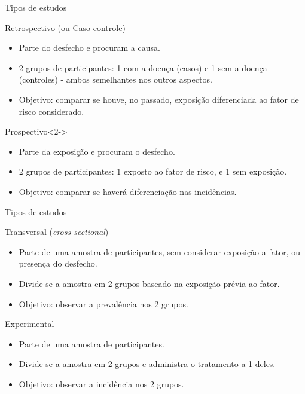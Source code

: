 \documentclass{beamer}
\begin{document}
\begin{frame}{\scriptsize Tipos de estudos}
  \begin{block}{Retrospectivo (ou Caso-controle)}
    \footnotesize
    \begin{itemize}
      \footnotesize
    \item Parte do desfecho e procuram a causa.
    \item 2 grupos de participantes: 1 com a doença (casos) e 1 sem a doença (controles) - ambos semelhantes nos outros aspectos.
    \item Objetivo: comparar se houve, no passado, exposição diferenciada ao fator de risco considerado.
    \end{itemize}
  \end{block}
  \begin{block}{Prospectivo}<2->
    \footnotesize
    \begin{itemize}
      \footnotesize
    \item Parte da exposição e procuram o desfecho.
    \item 2 grupos de participantes: 1 exposto ao fator de risco, e 1 sem exposição.
    \item Objetivo: comparar se haverá diferenciação nas incidências.
    \end{itemize}
  \end{block}
\end{frame}

\begin{frame}{\scriptsize Tipos de estudos}
  \begin{block}{Transversal ({\em cross-sectional})}
    \footnotesize
    \begin{itemize}
      \footnotesize
    \item Parte de uma amostra de participantes, sem considerar exposição a fator, ou presença do desfecho.
    \item Divide-se a amostra em 2 grupos baseado na exposição prévia ao fator.
    \item Objetivo: observar a prevalência nos 2 grupos.
    \end{itemize}
  \end{block}
  \begin{block}{Experimental}
    \footnotesize
    \begin{itemize}
      \footnotesize
    \item Parte de uma amostra de participantes.
    \item Divide-se a amostra em 2 grupos e administra o tratamento a 1 deles.
    \item Objetivo: observar a incidência nos 2 grupos.
    \end{itemize}
  \end{block}
\end{frame}
\end{document}

